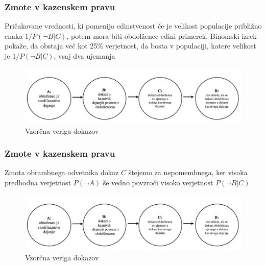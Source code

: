 \documentclass{beamer}
\begin{document}
\begin{frame}
    \frametitle{Zmote v kazenskem pravu}
    \begin{block}{Pričakovane vrednosti, ki pomenijo edinstvenost}
        če je velikost populacije približno enaka $1/P(\neg B \lvert C)$, potem mora biti
        obdolženec edini primerek. Binomski izrek pokaže, da obstaja več kot 25\% verjetnost, da bosta v populaciji, katere velikost je $1/P(\neg B \lvert C)$,
        vsaj dva ujemanja    
    \end{block}
    \begin{figure}[!ht]\label{fig:slika_3}
        \centering
        \includegraphics[scale=0.50]{slika_3.png}
        \caption{Vzorčna veriga dokazov}
    \end{figure}
\end{frame}

\begin{frame}
    \frametitle{Zmote v kazenskem pravu}
    \begin{block}{Zmota obrambnega odvetnika}
        dokaz $C$ štejemo za nepomembnega, ker visoka predhodna verjetnost $P(\neg A)$ še vedno povzroči visoko verjetnost $P(\neg B \lvert C)$    
    \end{block}
    \begin{figure}[!ht]\label{fig:slika_3}
        \centering
        \includegraphics[scale=0.50]{slika_3.png}
        \caption{Vzorčna veriga dokazov}
    \end{figure}
\end{frame}
\end{document}
